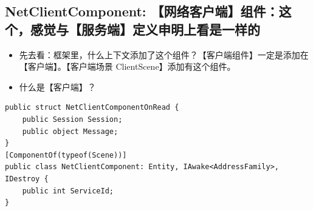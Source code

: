 \documentclass[9pt, b5paper]{article}
\begin{document}
\subsection{NetClientComponent: 【网络客户端】组件：这个，感觉与【服务端】定义申明上看是一样的}
\label{sec-3-7}
\begin{itemize}
\item 先去看：框架里，什么上下文添加了这个组件？【客户端组件】一定是添加在【客户端】。【客户端场景 ClientScene】添加有这个组件。
\item 什么是【客户端】？
\end{itemize}
\begin{verbatim}
public struct NetClientComponentOnRead {
    public Session Session;
    public object Message;
}
[ComponentOf(typeof(Scene))]
public class NetClientComponent: Entity, IAwake<AddressFamily>, IDestroy {
    public int ServiceId;
}
\end{verbatim}
\end{document}

